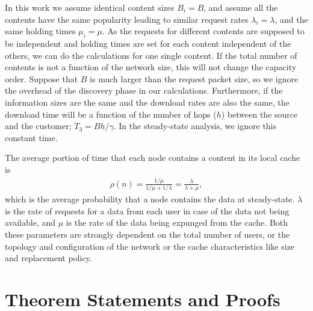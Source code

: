 \documentclass[journal]{IEEEtran}
\theoremstyle{plain}
\theoremstyle{remark}
\begin{document}
In this work we assume identical content sizes $B_i=B$, and assume all the contents have the same popularity leading to similar request rates $\lambda_i=\lambda$, and the same holding times $\mu_i=\mu$. As the requests for different contents are supposed to be independent and holding times are set for each content independent of the others, we can do the calculations for one single content. If the total number of contents is not a function of the network size, this will not change the capacity order.
Suppose that $B$ is much larger than the request packet size, so we ignore the overhead of the discovery phase in our calculations. Furthermore, if the information sizes are the same and the download rates are also the same, the download time will be a function of the number of hops ($h$) between the source and the customer; $T_3=Bh/\gamma$. In the steady-state analysis, we ignore this constant time.

The average portion of time that each node contains a content in its local cache is
\begin{eqnarray}
\rho(n)=\frac{1/\mu}{1/\mu+1/\lambda}=\frac{\lambda}{\lambda+\mu},
\end{eqnarray}
which is the average probability that a node contains the data at steady-state. $\lambda$ is the rate of requests for a data from each user in case of the data not being  available, and $\mu$ is the rate of the data being expunged from the cache. Both these parameters are strongly dependent on the total number of users, or the topology and configuration of the network or the cache characteristics like size and replacement policy. 


\section{Theorem Statements and Proofs}
\label{sec:theorems}
\end{document}
